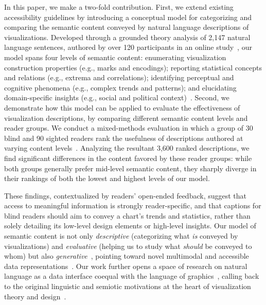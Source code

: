 In this paper, we make a two-fold contribution.
First, we extend existing accessibility guidelines by introducing a conceptual model for categorizing and comparing the semantic content conveyed by natural language descriptions of visualizations.
Developed through a grounded theory analysis of {2,147} natural language sentences, authored by over 120 participants in an online study~, our model spans four levels of semantic content: enumerating visualization construction properties (e.g., marks and encodings); reporting statistical concepts and relations (e.g., extrema and correlations); identifying perceptual and cognitive phenomena (e.g., complex trends and patterns); and elucidating domain-specific insights (e.g., social and political context)~.
Second, we demonstrate how this model can be applied to evaluate the effectiveness of visualization descriptions, by comparing different semantic content levels and reader groups.
We conduct a mixed-methods evaluation in which a group of {30} blind and {90} sighted readers rank the usefulness of descriptions authored at varying content levels~.
Analyzing the resultant {3,600} ranked descriptions, we find significant differences in the content favored by these reader groups: while both groups generally prefer mid-level semantic content, they sharply diverge in their rankings of both the lowest and highest levels of our model.

These findings, contextualized by readers' open-ended feedback, suggest that access to meaningful information is strongly {reader-specific}, and that captions for blind readers should aim to convey a chart's trends and statistics, rather than solely detailing its low-level design elements or high-level insights.
Our model of semantic content is not only \emph{descriptive} (categorizing what \emph{is} conveyed by visualizations) and \emph{evaluative} (helping us to study what \emph{should} be conveyed to whom) but also \emph{generative}~\cite{beaudouin-lafon_instrumental_2000, beaudouin-lafon_designing_2004}, pointing toward novel multimodal and accessible data representations~.
Our work further opens a space of research on natural language as a data interface coequal with the language of graphics~\cite{bertin_semiology_1983}, calling back to the original linguistic and semiotic motivations at the heart of visualization theory and design~.